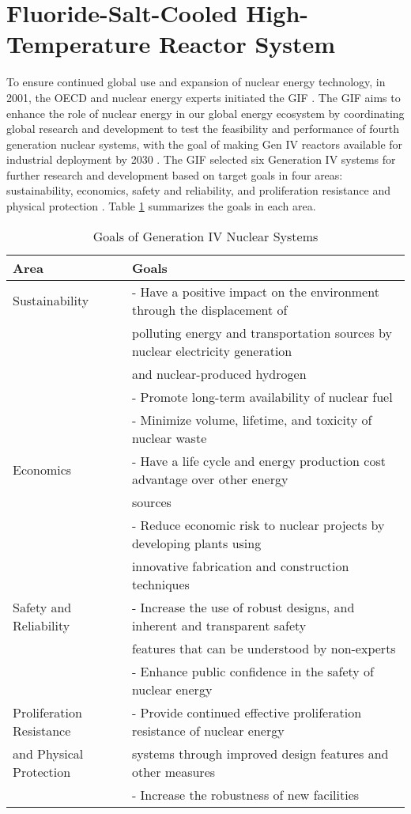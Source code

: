 \section{Fluoride-Salt-Cooled High-Temperature Reactor System}
\label{sec:fhr}
To ensure continued global use and expansion of nuclear energy technology, in 
2001, the \gls{OECD} and nuclear energy experts initiated the \gls{GIF} 
\cite{gif_technology_2002}.
The \gls{GIF} aims to enhance the role of nuclear energy in our global energy 
ecosystem by coordinating global research and development to test the 
feasibility and performance of fourth generation nuclear systems, with the goal 
of making Gen IV reactors available for industrial deployment by 2030 
\cite{gif_technology_2002}.
The \gls{GIF} selected six Generation IV systems for further research and 
development based on target goals in four areas: sustainability, 
economics, safety and reliability, and proliferation resistance and physical 
protection \cite{gif_technology_2002}. 
Table \ref{tab:goals-gen4} summarizes the goals in each area. 
\begin{table}[]
    \centering
    \onehalfspacing
    \caption{Goals of Generation IV Nuclear Systems \cite{gif_technology_2002,
    behar_technology_2014}}
	\label{tab:goals-gen4}
    \footnotesize
    \begin{tabular}{l|l}
    \hline
                               \textbf{Area} & \textbf{Goals} \\ \hline
    Sustainability   & - Have a positive impact on the environment through the displacement of \\
    & polluting energy and transportation sources by nuclear electricity generation \\
    & and nuclear-produced hydrogen \\ 
    & - Promote long-term availability of nuclear fuel \\
    & - Minimize volume, lifetime, and toxicity of nuclear waste \\ \hline
    Economics & - Have a life cycle and energy production cost advantage over other energy \\
    & sources \\ 
    & - Reduce economic risk to nuclear projects by developing plants using \\
    & innovative fabrication and construction techniques \\ \hline
    Safety and Reliability   & - Increase the use of robust designs, and inherent and transparent safety\\
    & features that can be understood by non-experts \\ 
    & - Enhance public confidence in the safety of nuclear energy \\\hline
    Proliferation Resistance & - Provide continued effective proliferation resistance of nuclear energy \\
    and Physical Protection & systems through improved design features and other measures \\ 
    & - Increase the robustness of new facilities \\ \hline
    \end{tabular}
\end{table}
